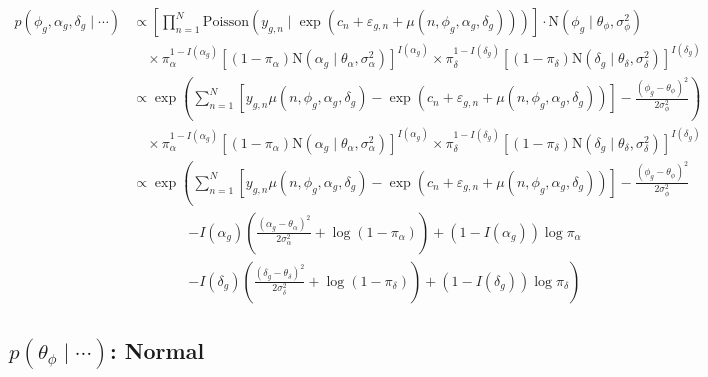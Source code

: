 \documentclass{article}\usepackage{graphicx, color}
\providecommand{\e}{\varepsilon}
\begin{document}
\begin{flushleft}
\begin{align*}
p(\phi_g, \alpha_g, \delta_g \mid \cdots) &\propto \left [ \prod_{n = 1}^N \text{Poisson}(y_{g, n} \mid \exp(c_n + \e_{g, n} + \mu(n, \phi_g, \alpha_g, \delta_g))) \right ] \cdot \text{N}(\phi_g \mid \theta_\phi, \sigma_\phi^2) \\
& \quad \times  \pi_\alpha^{1-I(\alpha_g)}[(1- \pi_\alpha)\text{N}(\alpha_g \mid \theta_\alpha, \sigma_\alpha^2)]^{I(\alpha_g)} \times  \pi_\delta^{1-I(\delta_g)}[(1- \pi_\delta)\text{N}(\delta_g \mid \theta_\delta, \sigma_\delta^2)]^{I(\delta_g)} \\
& \propto \exp \left (\sum_{n = 1}^N \left [y_{g, n} \mu(n, \phi_g, \alpha_g, \delta_g)  - \exp (c_n + \e_{g, n} + \mu(n, \phi_g, \alpha_g, \delta_g)) \right ] - \frac{(\phi_g - \theta_\phi)^2}{2 \sigma_\phi^2} \right ) \\
& \quad \times  \pi_\alpha^{1-I(\alpha_g)}[(1- \pi_\alpha)\text{N}(\alpha_g \mid \theta_\alpha, \sigma_\alpha^2)]^{I(\alpha_g)} \times  \pi_\delta^{1-I(\delta_g)}[(1- \pi_\delta)\text{N}(\delta_g \mid \theta_\delta, \sigma_\delta^2)]^{I(\delta_g)} \\
& \propto  \exp \left (\sum_{n = 1}^N \left [y_{g, n} \mu(n, \phi_g, \alpha_g, \delta_g)  - \exp (c_n + \e_{g, n} + \mu(n, \phi_g, \alpha_g, \delta_g)) \right ] - \frac{(\phi_g - \theta_\phi)^2}{2 \sigma_\phi^2} \right . \\
& \qquad \qquad \left . - I(\alpha_g) \left ( \frac{(\alpha_g - \theta_\alpha)^2}{2 \sigma_\alpha^2} + \log( 1 - \pi_\alpha) \right ) + (1 - I(\alpha_g)) \log \pi_\alpha  \right . \\
& \qquad \qquad \left . - I(\delta_g) \left ( \frac{(\delta_g - \theta_\delta)^2}{2 \sigma_\delta^2} + \log( 1 - \pi_\delta) \right ) + (1 - I(\delta_g)) \log \pi_\delta  \right )
\end{align*}

\subsection{$p(\theta_\phi \mid \cdots )$: Normal}



\end{flushleft}
\end{document}

